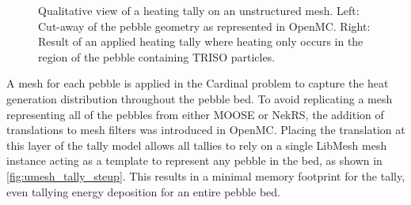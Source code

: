 \begin{figure}
    \centering
    \hspace*{.2in}
    \caption{Qualitative view of a heating tally on an unstructured mesh. Left: Cut-away of the pebble geometry as represented in OpenMC. Right: Result of an applied heating tally where heating only occurs in the region of the pebble containing TRISO particles.}
    \label{fig:pebble_umesh}
\end{figure}

A mesh for each pebble is applied in the Cardinal problem to capture the heat generation distribution throughout the pebble bed. To avoid replicating a mesh representing all of the pebbles from either MOOSE or NekRS, the addition of translations to mesh filters was introduced in OpenMC. Placing the translation at this layer of the tally model allows all tallies to rely on a single LibMesh mesh instance acting as a template to represent any pebble in the bed, as shown in \autoref{fig:umesh_tally_steup}. This results in a minimal memory footprint for the tally, even tallying energy deposition for an entire pebble bed.

